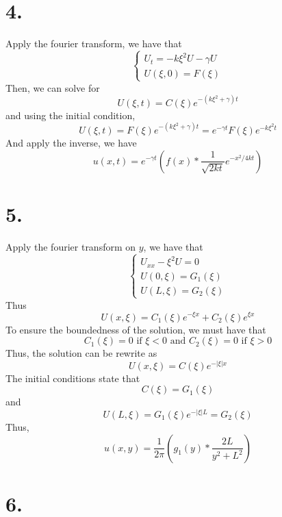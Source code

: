 \documentclass[11pt]{article}
\theoremstyle{mystyle}
\theoremstyle{definition}
\begin{document}
\section*{4.}
Apply the fourier transform, we have that 
\[
  \begin{cases}
    U_t = -k\xi^2 U - \gamma U \\
    U(\xi,0) = F(\xi) 
  \end{cases}
\]
Then, we can solve for 
\[
  U(\xi, t) = C(\xi) e^{-(k \xi^2 + \gamma)t}
\]
and using the initial condition, 
\[
  U(\xi, t) = F(\xi) e^{-(k \xi^2 + \gamma)t} = e^{-\gamma t} F(\xi) e^{-k\xi^2 t}
\]
And apply the inverse, we have 
\[
  u(x,t) = e^{-\gamma t} \left(f(x) * \displaystyle\frac{1}{\sqrt{2kt}} e^{-x^2/4kt} \right) 
\]
\newpage
\section*{5.}
Apply the fourier transform on $y$, we have that 
\[
  \begin{cases}
    U_{xx} -\xi^2 U = 0 \\
    U(0,\xi) = G_1(\xi) \\
    U(L, \xi) = G_2(\xi)
  \end{cases}
\]
Thus 
\[
  U(x, \xi) = C_1(\xi) e^{-\xi x} + C_2(\xi) e^{\xi x}
\]
To ensure the boundedness of the solution, we must have that 
\[
  C_1(\xi) = 0 \text{ if } \xi < 0 \text{ and } C_2(\xi) = 0 \text{ if } \xi > 0
\]
Thus, the solution can be rewrite as 
\[
  U(x,\xi) = C(\xi) e^{-|\xi|x}
\]
The initial conditions state that 
\[
  C(\xi) = G_1(\xi) 
\]
and 
\[
  U(L,\xi) = G_1(\xi) e^{-|\xi| L} = G_2(\xi)
\]
Thus, 
\[
  u(x,y) = \displaystyle\frac{1}{2\pi} \left(g_1(y) * \displaystyle\frac{2L}{y^2 + L^2}\right)
\]
\newpage
\section*{6.}
\end{document}

